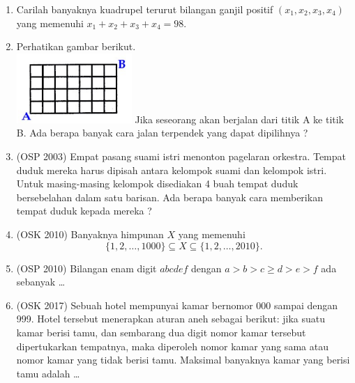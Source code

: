 \documentclass[11pt]{scrartcl}
\begin{document}
\begin{enumerate}
    \item Carilah banyaknya kuadrupel terurut bilangan ganjil positif $(x_1, x_2, x_3, x_4)$ yang memenuhi
$x_1 + x_2 + x_3 + x_4 = 98$.

    \item Perhatikan gambar berikut.\\
    \includegraphics[scale=1.2]{kombin.PNG}
    Jika seseorang akan berjalan dari titik A ke titik B. Ada berapa banyak cara jalan terpendek 
yang dapat dipilihnya ?
    
    \item (OSP 2003) Empat pasang suami istri menonton pagelaran orkestra. Tempat duduk mereka harus 
dipisah antara kelompok suami dan kelompok istri. Untuk masing-masing kelompok disediakan 4
buah tempat duduk bersebelahan dalam satu barisan. Ada berapa banyak cara memberikan 
tempat duduk kepada mereka ?

    \item (OSK 2010) Banyaknya himpunan $X$ yang memenuhi 
$$\{1,2,\dots,1000\} \subseteq X \subseteq \{1,2,\dots,2010\}.$$

    \item (OSP 2010) Bilangan enam digit $abcdef$ dengan $a > b > c \ge d > e > f$ ada sebanyak \dots
    
    \item (OSK 2017)
	Sebuah hotel mempunyai kamar bernomor 000 sampai dengan 999. Hotel tersebut menerapkan
aturan aneh sebagai berikut: jika suatu kamar berisi tamu, dan sembarang dua digit nomor kamar
tersebut dipertukarkan tempatnya, maka diperoleh nomor kamar yang sama atau nomor kamar
yang tidak berisi tamu. Maksimal banyaknya kamar yang berisi tamu adalah \dots
\end{enumerate}
\end{document}
